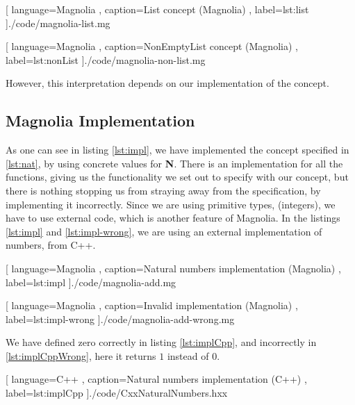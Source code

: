 \begin{center}
  
    [ language=Magnolia
    , caption={List concept (Magnolia)}
    , label=lst:list
    ]{./code/magnolia-list.mg}
\end{center}

\begin{center}
  
    [ language=Magnolia
    , caption={NonEmptyList concept (Magnolia)}
    , label=lst:nonList
    ]{./code/magnolia-non-list.mg}
\end{center}

However, this interpretation depends on our implementation of the concept.

\subsection{Magnolia Implementation}

As one can see in listing \ref{lst:impl}, we have implemented the concept
specified in \ref{lst:nat}, by using concrete values for \textbf{N}. There is an
implementation for all the functions, giving us the functionality we set out to
specify with our concept, but there is nothing stopping us from straying away
from the specification, by implementing it incorrectly. Since we are using
primitive types, (integers), we have to use external code, which is another
feature of Magnolia. In the listings \ref{lst:impl} and \ref{lst:impl-wrong},
we are using an external implementation of numbers, from C++.

\begin{code}[]
  
    [ language=Magnolia
    , caption={Natural numbers implementation (Magnolia)}
    , label=lst:impl
    ]{./code/magnolia-add.mg}
\end{code}

\begin{code}[]
  
    [ language=Magnolia
    , caption={Invalid implementation (Magnolia)}
    , label=lst:impl-wrong
    ]{./code/magnolia-add-wrong.mg}
\end{code}

We have defined zero correctly in listing \ref{lst:implCpp}, and incorrectly in
\ref{lst:implCppWrong}, here it returns $1$ instead of $0$.

\begin{code}[H]
  
    [ language=C++
    , caption={Natural numbers implementation (C++)}
    , label=lst:implCpp
    ]{./code/CxxNaturalNumbers.hxx}
\end{code}

